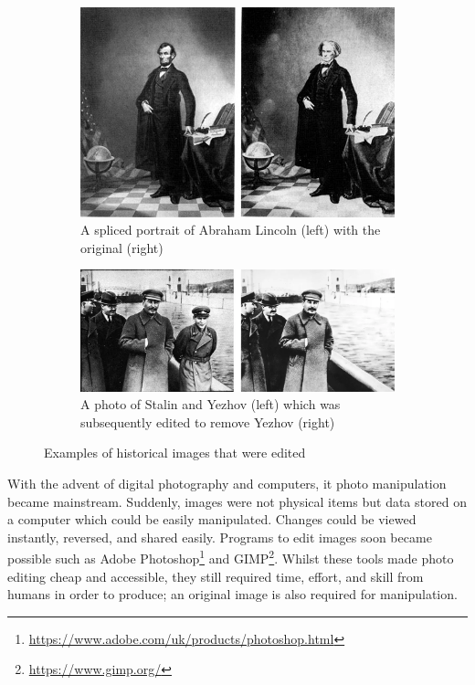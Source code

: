 \begin{figure}[H]
    \centering
    \begin{subfigure}[t]{0.45\textwidth}
            \includegraphics[width=\textwidth]{dissertation//figures/lincoln1960.jpg}
            \caption{A spliced portrait of Abraham Lincoln (left) with the original (right)\cite{singh2018art}}
            \label{fig:lincoln}
    \end{subfigure}
    \begin{subfigure}[t]{0.45\textwidth}
        \includegraphics[width=\textwidth]{dissertation//figures/stalin.png}
        \caption{A photo of Stalin and Yezhov (left) which was subsequently edited to remove Yezhov (right)}
        \label{fig:stalin-yezhov}
    \end{subfigure}
    \caption{Examples of historical images that were edited}
    \label{fig:edited-images}
\end{figure}

With the advent of digital photography and computers, it photo manipulation became mainstream. Suddenly, images were not physical items but data stored on a computer which could be easily manipulated. Changes could be viewed instantly, reversed, and shared easily. Programs to edit images soon became possible such as Adobe Photoshop\footnote{\url{https://www.adobe.com/uk/products/photoshop.html}} and GIMP\footnote{\url{https://www.gimp.org/}}. Whilst these tools made photo editing cheap and accessible, they still required time, effort, and skill from humans in order to produce; an original image is also required for manipulation.


